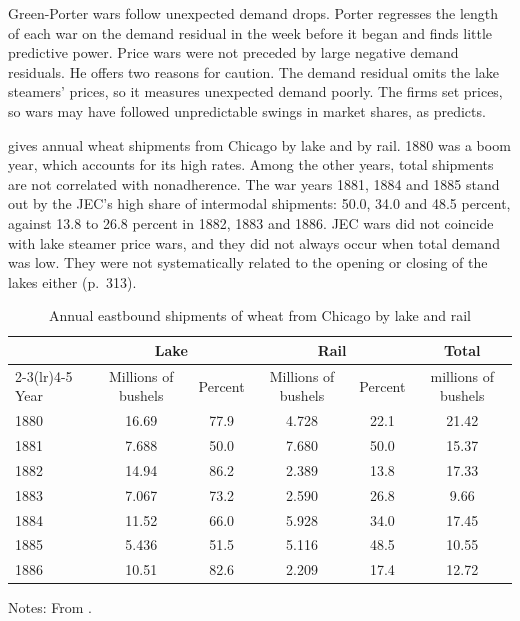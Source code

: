 Green-Porter wars follow unexpected demand drops. Porter regresses the length of each war on the demand residual in
the week before it began and finds little predictive power. Price wars were not preceded by large negative demand
residuals. He offers two reasons for caution. The demand residual omits the lake steamers' prices, so it measures
unexpected demand poorly. The firms set prices, so wars may have followed unpredictable swings in market shares, as
\citet{Stigler1964} predicts.

 gives annual wheat shipments from Chicago by lake and by rail. 1880 was a boom year, which
accounts for its high rates. Among the other years, total shipments are not correlated with nonadherence. The war
years 1881, 1884 and 1885 stand out by the JEC's high share of intermodal shipments: 50.0, 34.0 and 48.5 percent,
against 13.8 to 26.8 percent in 1882, 1883 and 1886. JEC wars did not coincide with lake steamer price wars, and they
did not always occur when total demand was low. They were not systematically related to the opening or closing of the
lakes either (p.~313).

\begin{table}[htbp]
\centering
\caption{Annual eastbound shipments of wheat from Chicago by lake and rail}\label{tab:13-porter-t6}
\small
\begin{tabular}{@{}lccccc@{}}
\toprule
 & \multicolumn{2}{c}{Lake} & \multicolumn{2}{c}{Rail} & Total\\
\cmidrule(lr){2-3}\cmidrule(lr){4-5}
Year & Millions of bushels & Percent & Millions of bushels & Percent & millions of bushels\\
\midrule
1880 & 16.69 & 77.9 & 4.728 & 22.1 & 21.42\\
1881 & 7.688 & 50.0 & 7.680 & 50.0 & 15.37\\
1882 & 14.94 & 86.2 & 2.389 & 13.8 & 17.33\\
1883 & 7.067 & 73.2 & 2.590 & 26.8 & 9.66\\
1884 & 11.52 & 66.0 & 5.928 & 34.0 & 17.45\\
1885 & 5.436 & 51.5 & 5.116 & 48.5 & 10.55\\
1886 & 10.51 & 82.6 & 2.209 & 17.4 & 12.72\\
\bottomrule
\end{tabular}

\smallskip
\begin{minipage}{0.75\textwidth}\footnotesize
Notes: From \citet[Table~6]{Porter1983}.
\end{minipage}
\end{table}

